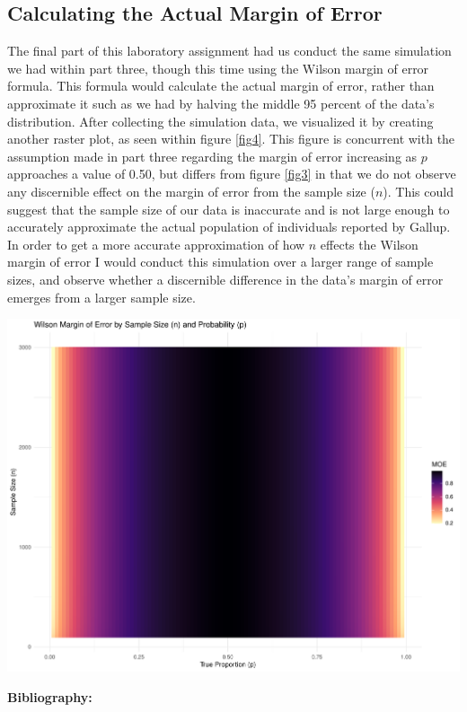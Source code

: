 \documentclass{article}\usepackage[]{graphicx}\usepackage[]{xcolor}
\newenvironment{Figure}
  {\par\medskip\noindent\minipage{\linewidth}}
  {\endminipage\par\medskip}
\begin{document}
\begin{multicols}{2}
\section{Calculating the Actual Margin of Error}
The final part of this laboratory assignment had us conduct the same simulation we had within part three, though this time using the Wilson margin of error formula. This formula would calculate the actual margin of error, rather than approximate it such as we had by halving the middle 95 percent of the data's distribution. After collecting the simulation data, we visualized it by creating another raster plot, as seen within figure \ref{fig4}. This figure is concurrent with the assumption made in part three regarding the margin of error increasing as $p$ approaches a value of 0.50, but differs from figure \ref{fig3} in that we do not observe any discernible effect on the margin of error from the sample size ($n$). This could suggest that the sample size of our data is inaccurate and is not large enough to accurately approximate the actual population of individuals reported by Gallup. In order to get a more accurate approximation of how $n$ effects the Wilson margin of error I would conduct this simulation over a larger range of sample sizes, and observe whether a discernible difference in the data's margin of error emerges from a larger sample size.
\begin{Figure}
\includegraphics[scale=0.4]{pt4plot.pdf}
\label{fig4}
\end{Figure}
\vspace{2em}

\noindent\textbf{Bibliography:} 

\begin{tiny}

\end{tiny}
\end{multicols}
\end{document}
